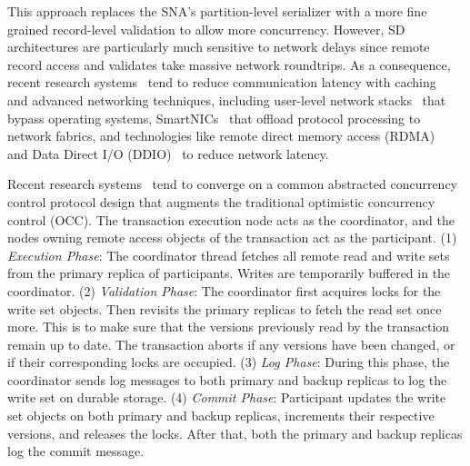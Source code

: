 This approach replaces the SNA's partition-level serializer with a more fine grained record-level validation to allow more concurrency. However, SD architectures are particularly much sensitive to network delays since remote record access and validates take massive network roundtrips. 
As a consequence, recent research systems~\cite{drtm, drtmh, farm, fasst, compromise} tend to reduce communication latency with caching~\cite{learned_cache, gam} and advanced networking techniques, including user-level network stacks~\cite{mtcp_nsdi14} that bypass operating systems, SmartNICs~\cite{xenic_sosp21, ipipe_sigcomm19, linefs_sosp21} that offload protocol processing to network fabrics, and technologies like remote direct memory access (RDMA)~\cite{farm, myth_vldb17} and Data Direct I/O (DDIO)~\cite{ddio_ispass20, ddio-doc} to reduce network latency. 






Recent research systems~\cite{drtm, drtmh, farm, fasst, compromise} tend to converge on a common abstracted concurrency control protocol design that augments the traditional optimistic concurrency control (OCC). 
The transaction execution node acts as the coordinator, and the nodes owning remote access objects of the transaction act as the participant. 
(1) \textit{Execution Phase}: The coordinator thread fetches all remote read and write sets from the primary replica of participants. Writes are temporarily buffered in the coordinator. 
(2) \textit{Validation Phase}: The coordinator first acquires locks for the write set objects. Then revisits the primary replicas to fetch the read set once more. This is to make sure that the versions previously read by the transaction remain up to date. The transaction aborts if any versions have been changed, or if their corresponding locks are occupied. 
(3) \textit{Log Phase}: During this phase, the coordinator sends log messages to both primary and backup replicas to log the write set on durable storage. 
(4) \textit{Commit Phase}: Participant updates the write set objects on both primary and backup replicas, increments their respective versions, and releases the locks. After that, both the primary and backup replicas log the commit message. 

